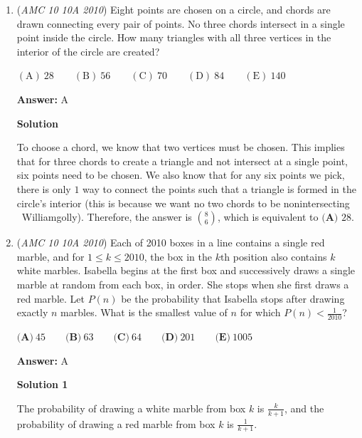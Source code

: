 \begin{enumerate}
 $2)$: The smallest number should multiply since that would make the numbers optimally small. Therefore, we want $2$ times $3$.

 \href{https://artofproblemsolving.com/wiki/index.php?title=Vieta\%27s\_Formulas}{Vieta's Formulas}

 


	\item (\textit{AMC 10 10A 2010}) Eight points are chosen on a circle, and chords are drawn connecting every pair of points. No three chords intersect in a single point inside the circle. How many triangles with all three vertices in the interior of the circle are created?


 $\mathrm{(A)}\ 28 \qquad \mathrm{(B)}\ 56 \qquad \mathrm{(C)}\ 70 \qquad \mathrm{(D)}\ 84 \qquad \mathrm{(E)}\ 140$

 \textbf{Answer: }A



\textbf{Solution}

To choose a chord, we know that two vertices must be chosen. This implies that for three chords to create a triangle and not intersect at a single point, six points need to be chosen. We also know that for any six points we pick, there is only $1$ way to connect the points such that a triangle is formed in the circle's interior (this is because we want no two chords to be nonintersecting ~Williamgolly). Therefore, the answer is ${{8}\choose{6}}$, which is equivalent to $\boxed{\textbf{(A) }28}$.

 


	\item (\textit{AMC 10 10A 2010}) Each of 2010 boxes in a line contains a single red marble, and for $1 \le k \le 2010$, the box in the $k\text{th}$ position also contains $k$ white marbles. Isabella begins at the first box and successively draws a single marble at random from each box, in order. She stops when she first draws a red marble. Let $P(n)$ be the probability that Isabella stops after drawing exactly $n$ marbles. What is the smallest value of $n$ for which $P(n) < \frac{1}{2010}$?


 $\textbf{(A)}\ 45 \qquad \textbf{(B)}\ 63 \qquad \textbf{(C)}\ 64 \qquad \textbf{(D)}\ 201 \qquad \textbf{(E)}\ 1005$

 \textbf{Answer: }A



\textbf{Solution 1}

The probability of drawing a white marble from box $k$ is $\frac{k}{k + 1}$, and the probability of drawing a red marble from box $k$ is $\frac{1}{k+1}$.


\end{enumerate}
